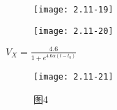\begin{figure}[H] %
	\begin{minipage}{\linewidth}
		\texttt{[image: 2.11-19]}
	\end{minipage}
\end{figure}

\begin{figure}[H] %
	\begin{minipage}{\linewidth}
		\texttt{[image: 2.11-20]}
	\end{minipage}
\end{figure}


$V_X=\frac{4.6}{1+e^{4.6 \alpha (t-t_0)}}$

\begin{figure}[H] %
	\begin{minipage}{\linewidth}
		\texttt{[image: 2.11-21]}
	\end{minipage}
	\caption*{图4} %
\end{figure}